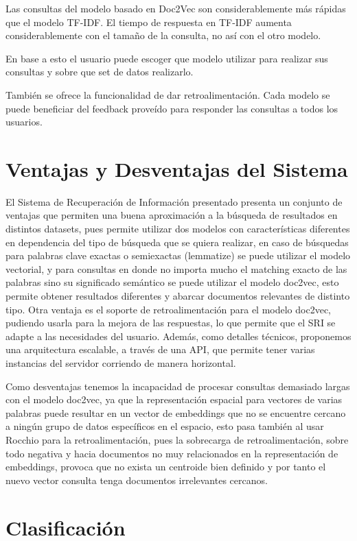 \documentclass[12pt]{llncs}
\begin{document}
Las consultas del modelo basado en Doc2Vec son considerablemente más rápidas que el modelo TF-IDF. El tiempo de respuesta en TF-IDF aumenta considerablemente con el tamaño de la consulta, no así con el otro modelo.

En base a esto el usuario puede escoger que modelo utilizar para realizar sus consultas y sobre que set de datos realizarlo.

También se ofrece la funcionalidad de dar retroalimentación. Cada modelo se puede beneficiar del feedback proveído para responder las consultas a todos los usuarios.

\section{Ventajas y Desventajas del Sistema}

El Sistema de Recuperación de Información presentado presenta un conjunto de ventajas que permiten una buena aproximación a la búsqueda de resultados en distintos datasets, pues permite utilizar dos modelos con características diferentes en dependencia del tipo de búsqueda que se quiera realizar, en caso de búsquedas para palabras clave exactas o semiexactas (lemmatize) se puede utilizar el modelo vectorial, y para consultas en donde no importa mucho el matching exacto de las palabras sino su significado semántico se puede utilizar el modelo doc2vec, esto permite obtener resultados diferentes y abarcar documentos relevantes de distinto tipo. Otra ventaja es el soporte de retroalimentación para el modelo doc2vec, pudiendo usarla para la mejora de las respuestas, lo que permite que el SRI se adapte a las necesidades del usuario. Además, como detalles técnicos, proponemos una arquitectura escalable, a través de una API, que permite tener varias instancias del servidor corriendo de manera horizontal.

Como desventajas tenemos la incapacidad de procesar consultas demasiado largas con el modelo doc2vec, ya que la representación espacial para vectores de varias palabras puede resultar en un vector de embeddings que no se encuentre cercano a ningún grupo de datos específicos en el espacio, esto pasa también al usar Rocchio para la retroalimentación, pues la sobrecarga de retroalimentación, sobre todo negativa y hacia documentos no muy relacionados en la representación de embeddings, provoca que no exista un centroide bien definido y por tanto el nuevo vector consulta tenga documentos irrelevantes cercanos.

\section{Clasificación}
\end{document}
